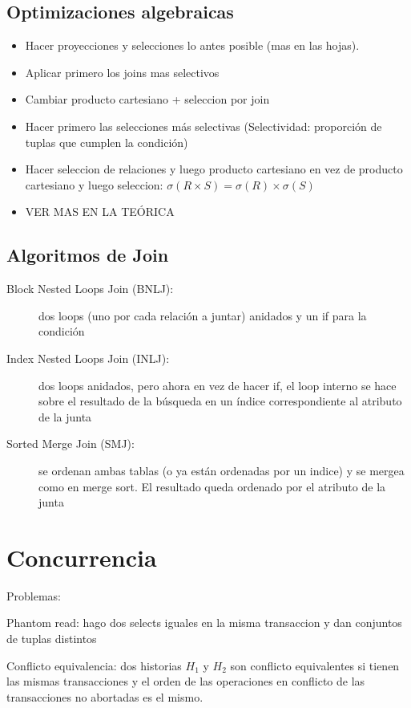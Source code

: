 \subsection{Optimizaciones algebraicas}

\begin{itemize}
	\item Hacer proyecciones y selecciones lo antes posible (mas en las hojas).
	\item Aplicar primero los joins mas selectivos
	\item Cambiar producto cartesiano + seleccion por join
	\item Hacer primero las selecciones más selectivas (Selectividad: proporción de tuplas que cumplen la condición)
	\item Hacer seleccion de relaciones y luego producto cartesiano en vez de producto cartesiano y luego seleccion: $\sigma(R \times S) = \sigma(R) \times \sigma(S)$
	\item VER MAS EN LA TEÓRICA
\end{itemize}

\subsection{Algoritmos de Join}

\begin{description}
	\item[Block Nested Loops Join (BNLJ):] dos loops (uno por cada relación a juntar) anidados y un if para la condición
	\item[Index Nested Loops Join (INLJ):] dos loops anidados, pero ahora en vez de hacer if, el loop interno se hace sobre el resultado de la búsqueda en un índice correspondiente al atributo de la junta
	\item[Sorted Merge Join (SMJ):] se ordenan ambas tablas (o ya están ordenadas por un indice) y se mergea como en merge sort. El resultado queda ordenado por el atributo de la junta
\end{description}

\section{Concurrencia}

Problemas:

Phantom read: hago dos selects iguales en la misma transaccion y dan conjuntos de tuplas distintos

Conflicto equivalencia: dos historias $H_1$ y $H_2$ son conflicto equivalentes si tienen las mismas transacciones y el
orden de las operaciones en conflicto de las transacciones no abortadas es el mismo.

